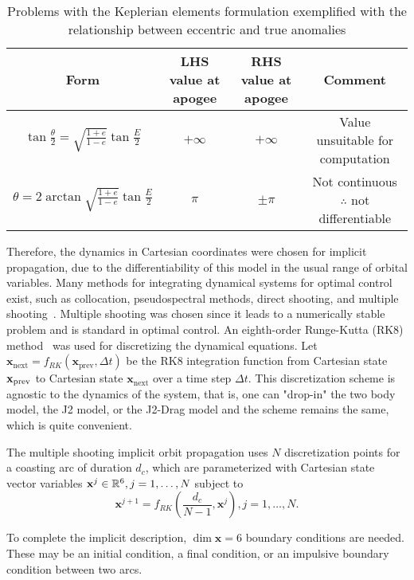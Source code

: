 \begin{table}[htbp]
    \centering
    \begin{tabular}{cccc} \toprule
        Form & LHS value at apogee & RHS value at apogee & Comment  \\ \midrule
        \(\tan{\frac{\theta}{2}} = \sqrt{\frac{1+e}{1-e}} \tan{\frac{E}{2}}\) & \(+\infty\) & \(+\infty\) & \parbox{2.5cm}{Value unsuitable for computation} \\
        \(\theta = 2\arctan{\sqrt{\frac{1+e}{1-e}} \tan{\frac{E}{2}}}\) & \(\pi\) & \(\pm\pi\) & \parbox{2.5cm}{Not continuous \(\therefore\) not differentiable} \\ \bottomrule
    \end{tabular}
    \caption{Problems with the Keplerian elements formulation exemplified with the relationship between eccentric and true anomalies}
    \label{tab:kep_ecc_true}
\end{table}

Therefore, the dynamics in Cartesian coordinates were chosen for implicit propagation, due to the differentiability of this model in the usual range of orbital variables. Many methods for integrating dynamical systems for optimal control exist, such as collocation, pseudospectral methods, direct shooting, and multiple shooting~\cite{numerical_recipes}. Multiple shooting was chosen since it leads to a numerically stable problem and is standard in optimal control. An eighth-order Runge-Kutta (RK8) method~\cite{rk8} was used for discretizing the dynamical equations. Let  \(\mathbf{x}_{\text{next}} = f_{RK}(\mathbf{x}_{\text{prev}}, \Delta t)\) be the RK8 integration function from Cartesian state \(\mathbf{x}_{\text{prev}}\) to Cartesian state \(\mathbf{x}_{\text{next}}\) over a time step \(\Delta t\). This discretization scheme is agnostic to the dynamics of the system, that is, one can "drop-in" the two body model, the J2 model, or the J2-Drag model and the scheme remains the same, which is quite convenient.

The multiple shooting implicit orbit propagation uses \(N\) discretization points for a coasting arc of duration \(d_c\), which are parameterized with Cartesian state vector variables \(\mathbf{x}^j \in \mathbb{R}^6, j=1,\dots,N\) subject to 
\begin{equation}
    \mathbf{x}^{j+1} = f_{RK}(\frac{d_c}{N - 1}, \mathbf{x}^j), j = 1, \dots, N.
\end{equation}

To complete the implicit description, \(\dim \mathbf{x} = 6\) boundary conditions are needed. These may be an initial condition, a final condition, or an impulsive boundary condition between two arcs.

